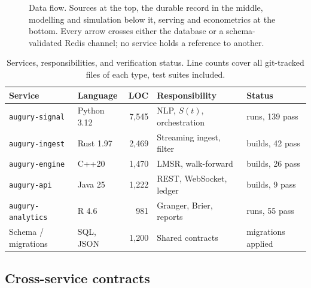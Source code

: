 \documentclass[11pt]{article}
\newcommand{\code}[1]{\texttt{\small #1}}
\begin{document}
\begin{figure}[htbp]
\caption[Service data flow across the five languages]{Data flow. Sources at the top, the durable record in the middle,
modelling and simulation below it, serving and econometrics at the bottom.
Every arrow crosses either the database or a schema-validated Redis channel;
no service holds a reference to another.}
\label{fig:arch}
\end{figure}

\begin{table}[htbp]
\centering
\caption[Services, responsibilities, and verification status]{Services, responsibilities, and verification status. Line counts cover
all git-tracked files of each type, test suites included.}
\label{tab:services}
\small
\begin{tabular}{@{}llrll@{}}
\toprule
Service & Language & LOC & Responsibility & Status \\
\midrule
\code{augury-signal}    & Python 3.12 & 7{,}545 & NLP, $S(t)$, orchestration & runs, 139 pass \\
\code{augury-ingest}    & Rust 1.97   & 2{,}469 & Streaming ingest, filter   & builds, 42 pass \\
\code{augury-engine}    & C++20       & 1{,}470 & LMSR, walk-forward         & builds, 26 pass \\
\code{augury-api}       & Java 25     & 1{,}222 & REST, WebSocket, ledger    & builds, 9 pass \\
\code{augury-analytics} & R 4.6       &   981   & Granger, Brier, reports    & runs, 55 pass \\
\midrule
Schema / migrations     & SQL, JSON   & 1{,}200 & Shared contracts           & migrations applied \\
\bottomrule
\end{tabular}
\end{table}

\subsection{Cross-service contracts}
\end{document}
